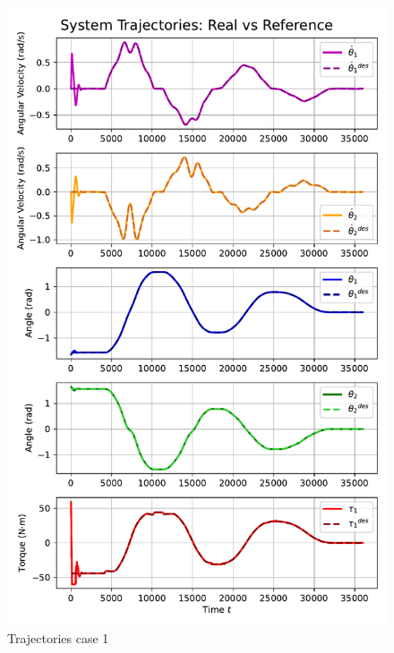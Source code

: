 \begin{figure}[htb]
    \centering
    \includegraphics[width=1\linewidth]{img/4-task4/MPC1.pdf}
    \caption{Trajectories case 1}
    \label{fig:dtheta1-evolution}
\end{figure}

